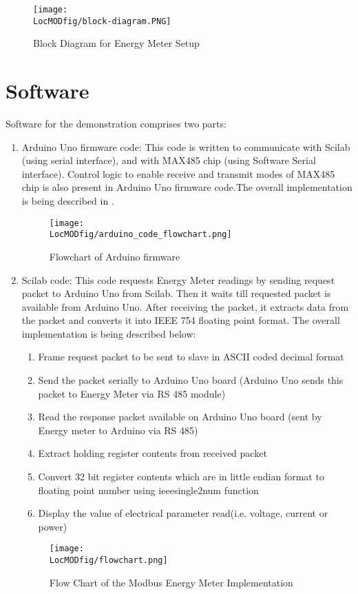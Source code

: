 \begin{figure}
\centering
\texttt{[image: \\LocMODfig/block-diagram.PNG]}
\caption{Block Diagram for Energy Meter Setup}
\label{fig:block-diagram}
\end{figure}

\section{Software}

Software for the demonstration comprises two parts:

\begin{enumerate}
\item Arduino Uno firmware code: This code is written to communicate
  with Scilab (using serial interface), and with MAX485 chip (using
  Software Serial interface). Control logic to enable receive and
  transmit modes of MAX485 chip is also present in Arduino Uno
  firmware code.The overall implementation is being described in
  .

\begin{figure}
\centering
\texttt{[image: \\LocMODfig/arduino\_code\_flowchart.png]}
\caption{Flowchart of Arduino firmware}
\label{fig:modbus-firmware}
\end{figure}

\item Scilab code: This code requests Energy Meter readings by sending
  request packet to Arduino Uno from Scilab. Then it waits till
  requested packet is available from Arduino Uno. After receiving the
  packet, it extracts data from the packet and converts it into IEEE
  754 floating point format. The overall implementation is being
  described below:

\begin {enumerate}
\item Frame request packet to be sent to slave in ASCII coded decimal
  format
\item Send the packet serially to Arduino Uno board (Arduino Uno sends
  this packet to Energy Meter via RS 485 module)
\item Read the response packet available on Arduino Uno board (sent by
  Energy meter to Arduino via RS 485)
\item Extract holding register contents from received packet
\item Convert 32 bit register contents which are in little endian
  format to floating point number using ieeesingle2num function
\item Display the value of electrical parameter read(i.e. voltage,
  current or power)
\end{enumerate}

\begin{figure}
\centering
\texttt{[image: \\LocMODfig/flowchart.png]}
\caption{Flow Chart of the Modbus Energy Meter Implementation}
\label{fig:flow-chart}
\end{figure}

\end{enumerate}

